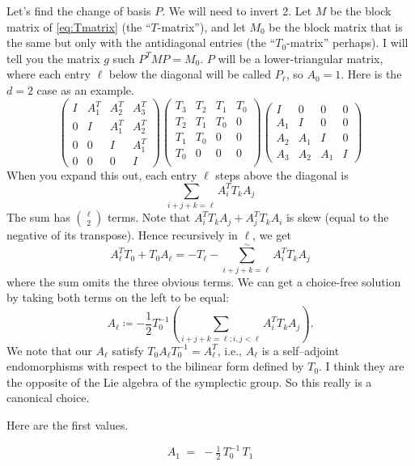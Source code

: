 {Let's find the change of basis $\boxed{P}$. We will need to invert 2.
Let $M$ be the block matrix of \eqref{eq:Tmatrix} (the ``$T$-matrix''), and let
$M_0$ be the block matrix that is the same but only with the antidiagonal entries (the ``$T_0$-matrix'' perhaps).
I will tell you the matrix $g$ such $P^T M P =M_0$.  $P$ will be a lower-triangular matrix, where
each entry $\ell$ below the diagonal will be called $P_{\ell}$, so $A_0=1$.  Here is the $d=2$ case
as an example.
$$
\begin{pmatrix}
  I & A_1^T & A_2^T & A_3^T \\
  0 &  I & A_1^T & A_2^T  \\
  0 &  0 &  I & A_1^T  \\
  0 &  0 &  0 &  I 
  \end{pmatrix}
  \begin{pmatrix}
    T_3 & T_2 & T_1 & T_0 \\
    T_2 & T_1 & T_0 & 0\\
    T_1 & T_0 & 0  & 0 \\
 T_0 & 0  & 0 & 0\\
  \end{pmatrix}
  \begin{pmatrix}
     I & 0 & 0 & 0 \\
    A_1 &      I & 0 & 0 \\
A_2 &     A_1 &      I & 0 \\
A_3 & A_2 &     A_1 &      I 
  \end{pmatrix}
$$
When you expand this out, each entry  $\ell$ steps above the diagonal
is
$$
\sum_{i+j+k=\ell} A_i^T T_k A_j
$$
The sum has $\binom \ell 2$ terms.
Note that $A_i^T T_k A_j + A_j^T T_k A_i$ is skew (equal to the negative of its transpose).
Hence recursively in $\ell$, we get
$$
A_\ell^T T_0 + T_0 A_\ell = - T_\ell  - \sum^\sim_{i+j+k=\ell} A_i^T T_k A_j
$$
where the sum omits the three obvious terms.
We can get a choice-free solution by taking both terms on the left to be equal:
$$
A_\ell \coloneq - \frac 1 2 T_0^{-1} \left(  \sum_{i+j+k=\ell; i,j<\ell} A_i^T T_k A_j \right).
$$
We note that our $A_\ell$ satisfy $T_0 A_\ell T_0^{-1} = A_\ell^T$, i.e.,  $A_\ell$ is
a  self–adjoint endomorphisms with respect to the bilinear form defined by $T_0$.  I think they are
the opposite of the Lie algebra of the symplectic group.   So this really is a canonical choice.

Here are the first values.

\[
A_1 \;=\; -\tfrac12\,T_0^{-1}\,T_1
\]


}
